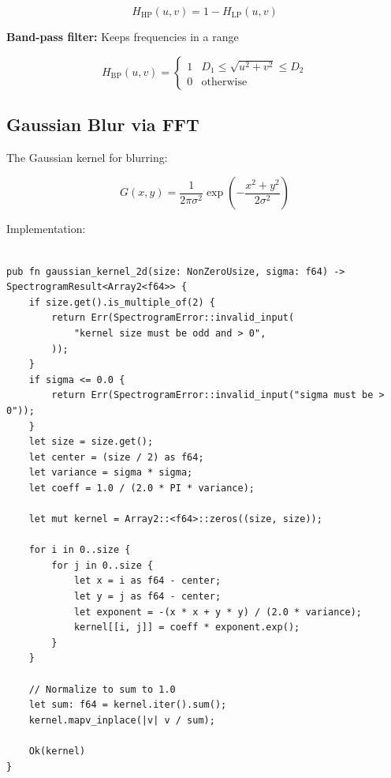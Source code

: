 \begin{equation}
  H_{\text{HP}}(u, v) = 1 - H_{\text{LP}}(u, v)
\end{equation}

\textbf{Band-pass filter:} Keeps frequencies in a range

\begin{equation}
  H_{\text{BP}}(u, v) =
  \begin{cases}
    1 & D_1 \leq \sqrt{u^2 + v^2} \leq D_2 \\
    0 & \text{otherwise}
  \end{cases}
\end{equation}

\subsection{Gaussian Blur via FFT}

The Gaussian kernel for blurring:

\begin{equation}
  G(x, y) = \frac{1}{2\pi\sigma^2} \exp\left(-\frac{x^2 + y^2}{2\sigma^2}\right)
\end{equation}

Implementation:

\begin{lstlisting}[caption={2D Gaussian kernel generation and normalisation}]

pub fn gaussian_kernel_2d(size: NonZeroUsize, sigma: f64) -> SpectrogramResult<Array2<f64>> {
    if size.get().is_multiple_of(2) {
        return Err(SpectrogramError::invalid_input(
            "kernel size must be odd and > 0",
        ));
    }
    if sigma <= 0.0 {
        return Err(SpectrogramError::invalid_input("sigma must be > 0"));
    }
    let size = size.get();
    let center = (size / 2) as f64;
    let variance = sigma * sigma;
    let coeff = 1.0 / (2.0 * PI * variance);

    let mut kernel = Array2::<f64>::zeros((size, size));

    for i in 0..size {
        for j in 0..size {
            let x = i as f64 - center;
            let y = j as f64 - center;
            let exponent = -(x * x + y * y) / (2.0 * variance);
            kernel[[i, j]] = coeff * exponent.exp();
        }
    }

    // Normalize to sum to 1.0
    let sum: f64 = kernel.iter().sum();
    kernel.mapv_inplace(|v| v / sum);

    Ok(kernel)
}
\end{lstlisting}

